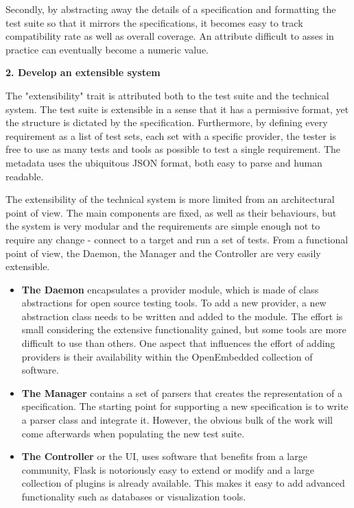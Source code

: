 Secondly, by abstracting away the details of a specification and formatting the test suite so that it mirrors the specifications, it becomes easy to track compatibility rate as well as overall coverage. An attribute difficult to asses in practice can eventually become a numeric value.

\textbf{2. Develop an extensible system}

The "extensibility" trait is attributed both to the test suite and the technical system. The test suite is extensible in a sense that it has a permissive format, yet the structure is dictated by the specification. Furthermore, by defining every requirement as a list of test sets, each set with a specific provider, the tester is free to use as many tests and tools as possible to test a single requirement. The metadata uses the ubiquitous JSON format, both easy to parse and human readable.

The extensibility of the technical system is more limited from an architectural point of view. The main components are fixed, as well as their behaviours, but the system is very modular and the requirements are simple enough not to require any change - connect to a target and run a set of tests. From a functional point of view, the Daemon, the Manager and the Controller are very easily extensible.

\begin{itemize}
\item \textbf{The Daemon} encapsulates a provider module, which is made of class abstractions for open source testing tools. To add a new provider, a new abstraction class needs to be written and added to the module. The effort is small considering the extensive functionality gained, but some tools are more difficult to use than others. One aspect that influences the effort of adding providers is their availability within the OpenEmbedded collection of software.
\item \textbf{The Manager} contains a set of parsers that creates the representation of a specification. The starting point for supporting a new specification is to write a parser class and integrate it. However, the obvious bulk of the work will come afterwards when populating the new test suite.
\item \textbf{The Controller} or the UI, uses software that benefits from a large community, Flask is notoriously easy to extend or modify and a large collection of plugins is already available. This makes it easy to add advanced functionality such as databases or visualization tools.
\end{itemize}


